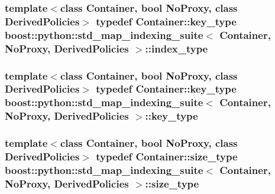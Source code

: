 \hypertarget{classboost_1_1python_1_1std__map__indexing__suite_a4b2ac75883fba93dbca6d9e83197c842}{
\subsubsection[{index\-\_\-type}]{\setlength{\rightskip}{0pt plus 5cm}template$<$class Container, bool No\-Proxy, class Derived\-Policies$>$ typedef Container\-::key\-\_\-type {\bf boost\-::python\-::std\-\_\-map\-\_\-indexing\-\_\-suite}$<$ Container, No\-Proxy, Derived\-Policies $>$\-::{\bf index\-\_\-type}}}\label{classboost_1_1python_1_1std__map__indexing__suite_a4b2ac75883fba93dbca6d9e83197c842}
\hypertarget{classboost_1_1python_1_1std__map__indexing__suite_a4e2daeb60a58d6ce9964e0ea27680009}{
\subsubsection[{key\-\_\-type}]{\setlength{\rightskip}{0pt plus 5cm}template$<$class Container, bool No\-Proxy, class Derived\-Policies$>$ typedef Container\-::key\-\_\-type {\bf boost\-::python\-::std\-\_\-map\-\_\-indexing\-\_\-suite}$<$ Container, No\-Proxy, Derived\-Policies $>$\-::{\bf key\-\_\-type}}}\label{classboost_1_1python_1_1std__map__indexing__suite_a4e2daeb60a58d6ce9964e0ea27680009}
\hypertarget{classboost_1_1python_1_1std__map__indexing__suite_ad1c24ad53b2e27b061f75591c74296c2}{
\subsubsection[{size\-\_\-type}]{\setlength{\rightskip}{0pt plus 5cm}template$<$class Container, bool No\-Proxy, class Derived\-Policies$>$ typedef Container\-::size\-\_\-type {\bf boost\-::python\-::std\-\_\-map\-\_\-indexing\-\_\-suite}$<$ Container, No\-Proxy, Derived\-Policies $>$\-::{\bf size\-\_\-type}}}\label{classboost_1_1python_1_1std__map__indexing__suite_ad1c24ad53b2e27b061f75591c74296c2}

